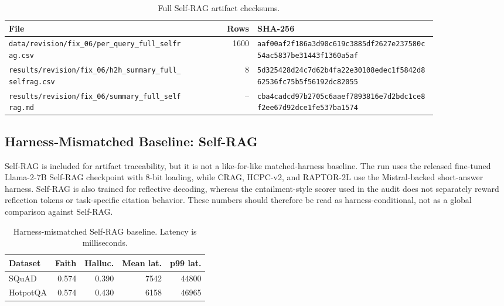 \begin{table}[H]
\centering
\tiny
\setlength{\tabcolsep}{2pt}
\caption{Full Self-RAG artifact checksums.}
\label{tab:selfrag_checksums}
\begin{tabular}{p{0.43\linewidth}rp{0.42\linewidth}}
\toprule
File & Rows & SHA-256 \\
\midrule
\texttt{data/revision/fix\_06/per\_query\_full\_selfrag.csv} & 1600 &
\texttt{aaf00af2f186a3d90c619c3885df2627e237580c54ac5837be31443f1360a5af} \\
\texttt{results/revision/fix\_06/h2h\_summary\_full\_selfrag.csv} & 8 &
\texttt{5d325428d24c7d62b4fa22e30108edec1f5842d862536fc75b5f56192dc82055} \\
\texttt{results/revision/fix\_06/summary\_full\_selfrag.md} & -- &
\texttt{cba4cadcd97b2705c6aaef7893816e7d2bdc1ce8f2ee67d92dce1fe537ba1574} \\
\bottomrule
\end{tabular}
\end{table}

\subsection{Harness-Mismatched Baseline: Self-RAG}
\label{app:selfrag_harness}

Self-RAG is included for artifact traceability, but it is not a like-for-like
matched-harness baseline. The run uses the released fine-tuned Llama-2-7B
Self-RAG checkpoint with 8-bit loading, while CRAG, HCPC-v2, and RAPTOR-2L use
the Mistral-backed short-answer harness. Self-RAG is also trained for
reflective decoding, whereas the entailment-style scorer used in the audit
does not separately reward reflection tokens or task-specific citation
behavior. These numbers should therefore be read as harness-conditional, not
as a global comparison against Self-RAG.

\begin{table}[H]
\centering
\small
\caption{Harness-mismatched Self-RAG baseline. Latency is milliseconds.}
\label{tab:selfrag_harness}
\begin{tabular}{lrrrr}
\toprule
Dataset & Faith & Halluc. & Mean lat. & p99 lat. \\
\midrule
SQuAD & 0.574 & 0.390 & 7542 & 44800 \\
HotpotQA & 0.574 & 0.430 & 6158 & 46965 \\
\bottomrule
\end{tabular}
\end{table}


